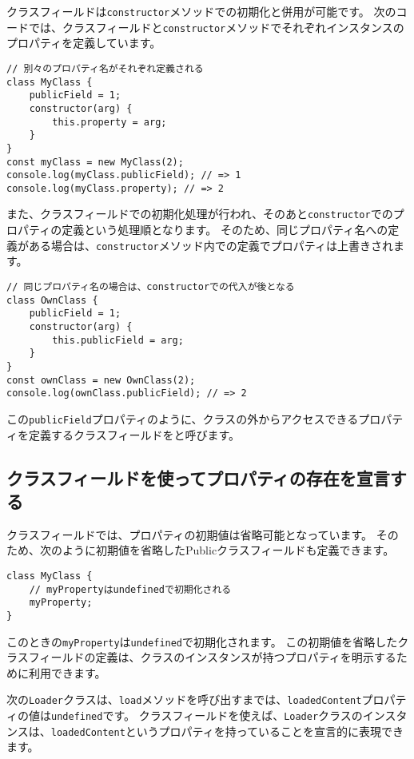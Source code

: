 クラスフィールドは\texttt{constructor}メソッドでの初期化と併用が可能です。
次のコードでは、クラスフィールドと\texttt{constructor}メソッドでそれぞれインスタンスのプロパティを定義しています。

\begin{lstlisting}
// 別々のプロパティ名がそれぞれ定義される
class MyClass {
    publicField = 1;
    constructor(arg) {
        this.property = arg;
    }
}
const myClass = new MyClass(2);
console.log(myClass.publicField); // => 1
console.log(myClass.property); // => 2
\end{lstlisting}

また、クラスフィールドでの初期化処理が行われ、そのあと\texttt{constructor}でのプロパティの定義という処理順となります。
そのため、同じプロパティ名への定義がある場合は、\texttt{constructor}メソッド内での定義でプロパティは上書きされます。

\begin{lstlisting}
// 同じプロパティ名の場合は、constructorでの代入が後となる
class OwnClass {
    publicField = 1;
    constructor(arg) {
        this.publicField = arg;
    }
}
const ownClass = new OwnClass(2);
console.log(ownClass.publicField); // => 2
\end{lstlisting}

この\texttt{publicField}プロパティのように、クラスの外からアクセスできるプロパティを定義するクラスフィールドを\textbf{}と呼びます。

\hypertarget{declare-class-fields}{%
\subsection{クラスフィールドを使ってプロパティの存在を宣言する}\label{declare-class-fields}}

クラスフィールドでは、プロパティの初期値は省略可能となっています。
そのため、次のように初期値を省略したPublicクラスフィールドも定義できます。

\begin{lstlisting}
class MyClass {
    // myPropertyはundefinedで初期化される
    myProperty;
}
\end{lstlisting}

このときの\texttt{myProperty}は\texttt{undefined}で初期化されます。
この初期値を省略したクラスフィールドの定義は、クラスのインスタンスが持つプロパティを明示するために利用できます。

次の\texttt{Loader}クラスは、\texttt{load}メソッドを呼び出すまでは、\texttt{loadedContent}プロパティの値は\texttt{undefined}です。
クラスフィールドを使えば、\texttt{Loader}クラスのインスタンスは、\texttt{loadedContent}というプロパティを持っていることを宣言的に表現できます。

